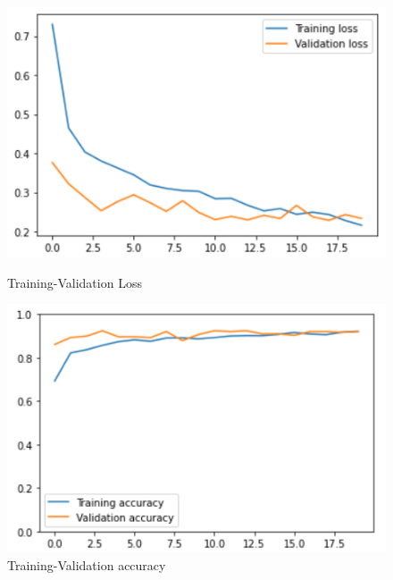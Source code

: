 \documentclass[11pt,a4paper]{article}
\theoremstyle{definition}
\begin{document}
\begin{figure}[H]
  \centering
  \begin{minipage}[b]{0.45\textwidth}
    \includegraphics[scale=0.75]{./images/inception1loss}
	\caption{Training-Validation Loss}
  \end{minipage}
  \hfill
  \begin{minipage}[b]{0.45\textwidth}
    \includegraphics[scale=0.75]{./images/inception1acc}
	\caption{Training-Validation accuracy}
  \end{minipage}
\end{figure}
\end{document}
